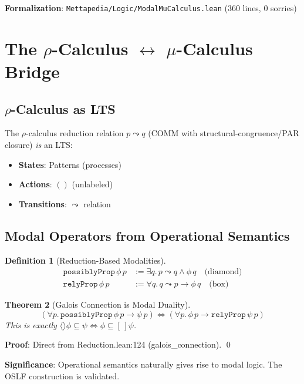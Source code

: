 \documentclass[11pt]{article}
\newtheorem{theorem}{Theorem}
\newtheorem{definition}[theorem]{Definition}
\begin{document}
\textbf{Formalization}: \texttt{Mettapedia/Logic/ModalMuCalculus.lean} (360 lines, 0 sorries)

\section{The $\rho$-Calculus $\leftrightarrow$ $\mu$-Calculus Bridge}

\subsection{$\rho$-Calculus as LTS}

The $\rho$-calculus reduction relation $p \leadsto q$ (COMM with structural-congruence/PAR closure) \emph{is} an LTS:
\begin{itemize}
\item \textbf{States}: Patterns (processes)
\item \textbf{Actions}: $()$ (unlabeled)
\item \textbf{Transitions}: $\leadsto$ relation
\end{itemize}

\subsection{Modal Operators from Operational Semantics}

\begin{definition}[Reduction-Based Modalities]
\begin{align*}
\texttt{possiblyProp}\, \phi\, p &:= \exists q.\, p \leadsto q \land \phi\, q \quad \text{(diamond)} \\
\texttt{relyProp}\, \phi\, p &:= \forall q.\, q \leadsto p \to \phi\, q \quad \text{(box)}
\end{align*}
\end{definition}

\begin{theorem}[Galois Connection is Modal Duality]
\[
(\forall p.\, \texttt{possiblyProp}\, \phi\, p \to \psi\, p) \iff (\forall p.\, \phi\, p \to \texttt{relyProp}\, \psi\, p)
\]
This is \emph{exactly} $\langle\rangle \phi \subseteq \psi \iff \phi \subseteq [\,] \psi$.
\end{theorem}

\textbf{Proof}: Direct from Reduction.lean:124 (galois\_connection). \qed

\textbf{Significance}: Operational semantics naturally gives rise to modal logic. The OSLF construction is validated.
\end{document}
